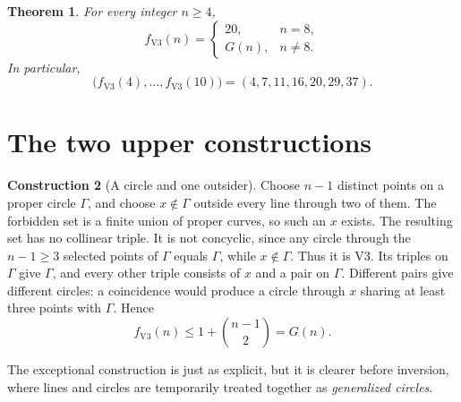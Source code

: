 \documentclass[11pt]{article}
\newtheorem{theorem}{Theorem}[section]
\theoremstyle{definition}
\newtheorem{construction}[theorem]{Construction}
\theoremstyle{remark}
\begin{document}
\begin{theorem}\label{thm:v3}
For every integer \(n\geq4\),
\[
 \boxed{
 f_{\mathrm{V3}}(n)=
 \begin{cases}
 20,&n=8,\\[1mm]
 G(n),&n\neq8.
 \end{cases}}
\]
In particular,
\[
 \bigl(f_{\mathrm{V3}}(4),\ldots,f_{\mathrm{V3}}(10)\bigr)
   =(4,7,11,16,20,29,37).
\]
\end{theorem}

\section{The two upper constructions}

\begin{construction}[A circle and one outsider]\label{con:near-circle}
Choose \(n-1\) distinct points on a proper circle \(\Gamma\), and choose
\(x\notin\Gamma\) outside every line through two of them.  The forbidden set
is a finite union of proper curves, so such an \(x\) exists.  The resulting
set has no collinear triple.  It is not concyclic, since any circle through
the \(n-1\geq3\) selected points of \(\Gamma\) equals \(\Gamma\), while
\(x\notin\Gamma\).  Thus it is V3.  Its triples on \(\Gamma\) give
\(\Gamma\), and every other triple
consists of \(x\) and a pair on \(\Gamma\).  Different pairs give different
circles: a coincidence would produce a circle through \(x\) sharing at least
three points with \(\Gamma\).  Hence
\begin{equation}\label{eq:upper-G}
 f_{\mathrm{V3}}(n)\leq1+\binom{n-1}{2}=G(n).
\end{equation}
\end{construction}

The exceptional construction is just as explicit, but it is clearer before
inversion, where lines and circles are temporarily treated together as
\emph{generalized circles}.
\end{document}
